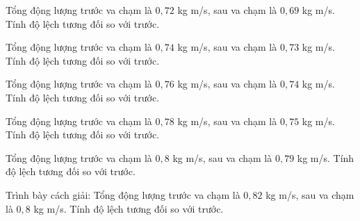 \begin{ex}
Tổng động lượng trước va chạm là $0,72$ kg m/s, sau va chạm là $0,69$ kg m/s. Tính độ lệch tương đối so với trước.
\end{ex}

\begin{ex}
Tổng động lượng trước va chạm là $0,74$ kg m/s, sau va chạm là $0,73$ kg m/s. Tính độ lệch tương đối so với trước.
\end{ex}

\begin{ex}
Tổng động lượng trước va chạm là $0,76$ kg m/s, sau va chạm là $0,74$ kg m/s. Tính độ lệch tương đối so với trước.
\end{ex}

\begin{ex}
Tổng động lượng trước va chạm là $0,78$ kg m/s, sau va chạm là $0,75$ kg m/s. Tính độ lệch tương đối so với trước.
\end{ex}

\begin{ex}
Tổng động lượng trước va chạm là $0,8$ kg m/s, sau va chạm là $0,79$ kg m/s. Tính độ lệch tương đối so với trước.
\end{ex}

\begin{bt}
Trình bày cách giải: Tổng động lượng trước va chạm là $0,82$ kg m/s, sau va chạm là $0,8$ kg m/s. Tính độ lệch tương đối so với trước.
\end{bt}

